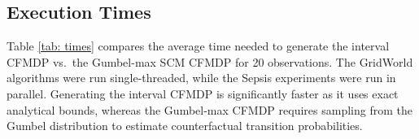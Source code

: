 \subsection{Execution Times}
Table \ref{tab: times} compares the average time needed to generate the interval CFMDP vs.\ the Gumbel-max SCM CFMDP for 20 observations.
The GridWorld algorithms were run single-threaded, while the Sepsis experiments were run in parallel.
Generating the interval CFMDP is significantly faster as it uses exact analytical bounds, whereas the Gumbel-max CFMDP requires sampling from the Gumbel distribution to estimate counterfactual transition probabilities. 
\begin{table}
\centering
\caption{Mean execution time to generate CFMDPs}
\label{tab: times}
\end{table}
